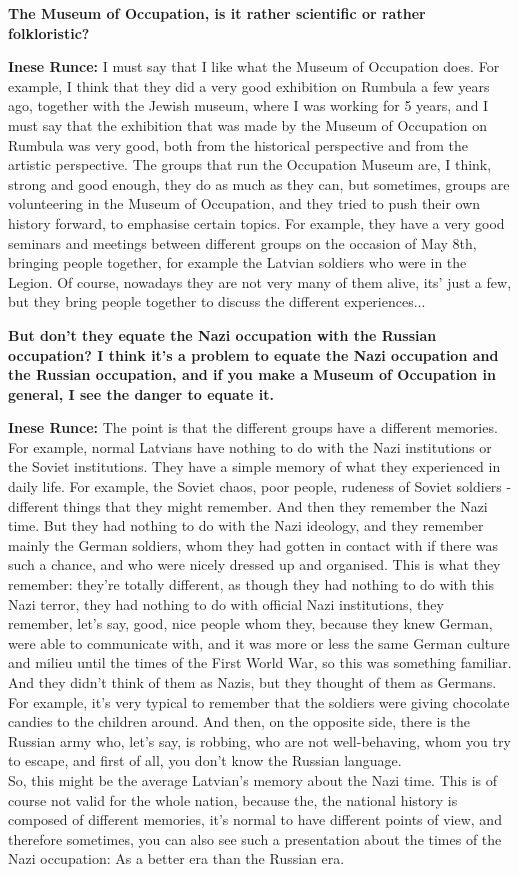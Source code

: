 \textbf{The Museum of Occupation, is it rather scientific or rather folkloristic?}

\textbf{Inese Runce:} I must say that I like what the Museum of Occupation does. For example, I think that they did a very good exhibition on Rumbula a few years ago, together with the Jewish museum, where I was working for 5 years, and I must say that the exhibition that was made by the Museum of Occupation on Rumbula was very good, both from the historical perspective and from the artistic perspective. The groups that run the Occupation Museum are, I think, strong and good enough, they do as much as they can, but sometimes, groups are volunteering in the Museum of Occupation, and they tried to push their own  history forward, to emphasise certain topics. For example, they have a very good seminars and meetings between different groups on the occasion of May 8th, bringing people together, for example the Latvian soldiers who were in the Legion. Of course, nowadays they are not very many of them alive, its' just a few, but they bring people together to discuss the different experiences...

\textbf{But don't they equate the Nazi occupation with the Russian occupation? I think it's a problem to equate the Nazi occupation and the Russian occupation, and if you make a Museum of Occupation in general, I see the danger to equate it.} 
 
\textbf{Inese Runce:} The point is that the different groups have a different memories. For example, normal Latvians have nothing to do with the Nazi institutions or the Soviet institutions. They have a simple memory of what they experienced in daily life.  For example, the Soviet chaos, poor people, rudeness of Soviet soldiers - different things that they might remember. And then they remember the Nazi time. But they had nothing to do with the Nazi ideology, and they remember mainly the German soldiers, whom they had gotten in contact with if there was such a chance, and who were nicely  dressed up and organised. This is what they remember: they're totally different, as though they had nothing to do with this Nazi terror, they had nothing to do with official Nazi institutions, they remember, let's say, good, nice people whom they, because they knew German, were able to communicate with, and it was more or less the same German culture and milieu until the times of the First World War, so this was something familiar. And they didn't think of them as Nazis, but they thought of them as Germans. For example,  it's very typical to remember that the soldiers were giving chocolate  candies to the children around. And then, on the opposite side, there is the Russian army who, let's say, is robbing, who are not well-behaving, whom you try to escape, and first of all, you don't know the Russian language. \\
So, this might be the average Latvian's memory about the Nazi time. This is of course not valid for the whole nation, because the, the national history is composed of different memories, it’s normal to have different points of view, and therefore sometimes, you can also see such a presentation about the times of the Nazi occupation: As a better era than the Russian era.
 
